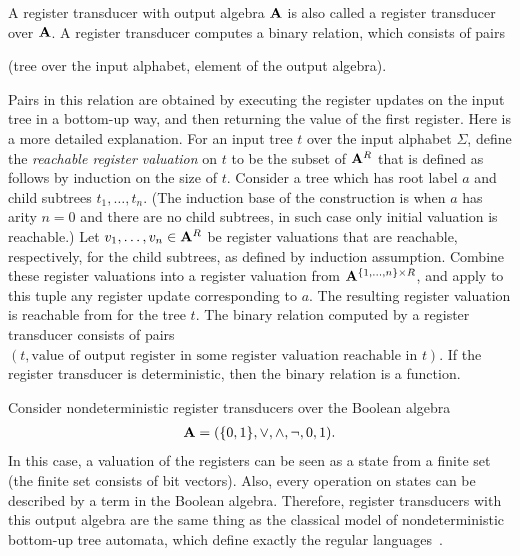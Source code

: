 A register transducer with output algebra  $\mathbf{A}$ is also called  a register transducer over $\mathbf{A}$.
A  register transducer computes a binary relation, which consists of pairs 
\begin{center}
    (tree over the input alphabet, element of the output algebra).
\end{center}
Pairs in this relation are obtained by  executing the register updates on the input tree in a bottom-up way, and then returning the value of the first register. Here is a more detailed explanation.  For an input  tree $t$ over the input alphabet $\Sigma$, define the \emph{reachable register valuation} on $t$ to be the subset  of $\mathbf{A}^R$ that is  defined as follows by  induction on the size of $t$. Consider a tree which has root label $a$ and child subtrees $t_1,\ldots,t_n$. (The induction base of the construction is when $a$ has arity $n=0$ and there are no child subtrees, in such case only initial valuation is reachable.) Let $v_1,\ldots,v_n \in \mathbf{A}^R$ be  register valuations that are reachable, respectively,  for the child subtrees, as defined by induction assumption. Combine these register valuations into a register valuation from $\mathbf{A}^{\{1,\ldots,n\} \times R}$, and apply to this tuple any register update corresponding to $a$. The resulting register valuation is reachable from for the tree $t$. The binary relation computed by a register transducer consists of pairs $(t,\text{value of output register in  some register valuation reachable in $t$})$. If the register transducer is deterministic, then the binary relation is a function. 

\begin{example}
    Consider nondeterministic register transducers over the Boolean algebra
    \begin{align*}
    \mathbf{A} = (\{0,1\},\lor, \land, \neg, 0, 1).
    \end{align*}
    In this case, a valuation of the registers can be seen as a state from a finite set (the finite set consists of bit vectors). Also, every operation on states can be described  by a term in the Boolean algebra. Therefore,  register transducers with this output algebra are the same thing as the classical model of nondeterministic bottom-up tree automata, which define exactly the regular languages~\cite[Section 2]{thatcherGeneralizedFiniteAutomata1968}. 
\end{example}

